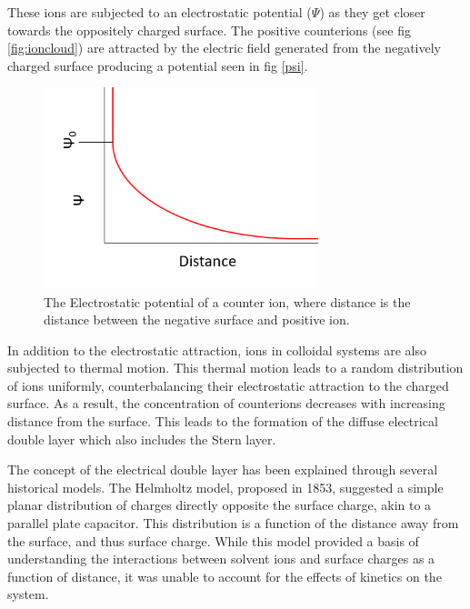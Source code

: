 These ions are subjected to an electrostatic potential ($\Psi$) as they get closer towards the oppositely charged surface. The positive counterions (see fig \ref{fig:ioncloud}) are attracted by the electric field generated from the negatively charged surface producing a potential seen in fig \ref{psi}. 

\begin{figure}[h]    
        \begin{center}
          \includegraphics[width=80mm]{chapter1/psi.PNG}
\end{center}
\caption{The Electrostatic potential of a counter ion, where distance is the distance between the negative surface and positive ion.}
\label{fig:psi}                
\end{figure}


In addition to the electrostatic attraction, ions in colloidal systems are also subjected to thermal motion. This thermal motion leads to a random distribution of ions uniformly, counterbalancing their electrostatic attraction to the charged surface. As a result, the concentration of counterions decreases with increasing distance from the surface. This leads to the formation of the diffuse electrical double layer which also includes the Stern layer. 

The concept of the electrical double layer has been explained through several historical models. The Helmholtz model, proposed in 1853, suggested a simple planar distribution of charges directly opposite the surface charge, akin to a parallel plate capacitor. This distribution is a function of the distance away from the surface, and thus surface charge. While this model provided a basis of understanding the interactions between solvent ions and surface charges as a function of distance, it was unable to account for the effects of kinetics on the system.

